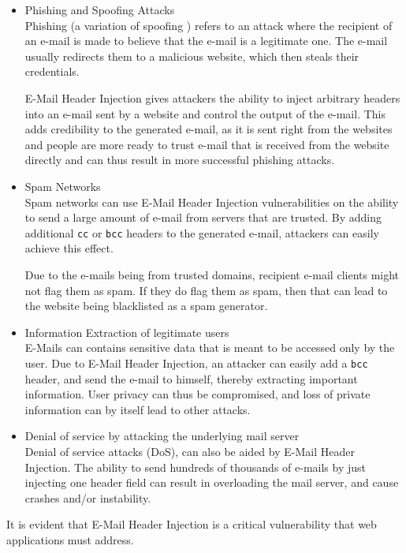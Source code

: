 \begin{itemize}
	\item Phishing and Spoofing Attacks\\
    Phishing \cite{wiki:Phishing} (a variation of spoofing \cite{wiki:Spoofing_attack}) refers to an attack where the recipient of an e-mail is made to believe that the e-mail is a legitimate one. The e-mail usually redirects them to a malicious website, which then steals their credentials. 
    
    E-Mail Header Injection gives attackers the ability to inject arbitrary headers into an e-mail sent by a website and control the output of the e-mail. This adds credibility to the generated e-mail, as it is sent right from the websites and people are more ready to trust e-mail that is received from the website directly and can thus result in more successful phishing attacks.
	
	\item Spam Networks\\
	Spam networks can use E-Mail Header Injection vulnerabilities on the ability to send a large amount of e-mail from servers that are trusted. By adding additional \texttt{cc} or \texttt{bcc} headers to the generated e-mail, attackers can easily achieve this effect. 
	
	Due to the e-mails being from trusted domains, recipient e-mail clients might not flag them as spam. If they do flag them as spam, then that can lead to the website being blacklisted as a spam generator. 
	
	\item Information Extraction of legitimate users\\
	E-Mails can contains sensitive data that is meant to be accessed only by the user. Due to E-Mail Header Injection, an attacker can easily add a \texttt{bcc} header, and send the e-mail to himself, thereby extracting important information.
	User privacy can thus be compromised, and loss of private information can by itself lead to other attacks.
	
	\item Denial of service by attacking the underlying mail server\\
    Denial of service attacks (DoS), can also be aided by E-Mail Header Injection. The ability to send hundreds of thousands of e-mails by just injecting one header field can result in overloading the mail server, and cause crashes and/or instability. 
\end{itemize}

It is evident that E-Mail Header Injection is a critical vulnerability that web applications must address.